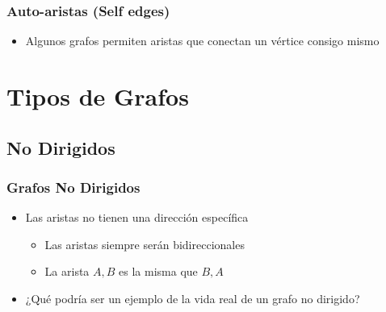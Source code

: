 \documentclass[11pt]{beamer}
\begin{document}
\begin{frame}\frametitle{Auto-aristas (Self edges)}
\begin{itemize}
\item Algunos grafos permiten aristas que conectan un vértice consigo mismo
\end{itemize}
\begin{center}
\end{center}
\end{frame}

\section{Tipos de Grafos}

\subsection{No Dirigidos}

\begin{frame}\frametitle{Grafos No Dirigidos}
\begin{itemize}
\item Las aristas no tienen una dirección específica
    \begin{itemize}
    \item Las aristas siempre serán bidireccionales
    \item La arista ${A,B}$ es la misma que ${B,A}$
    \end{itemize}
\pause
\item ¿Qué podría ser un ejemplo de la vida real de un grafo no dirigido? %
\end{itemize}
\end{frame}
\end{document}
